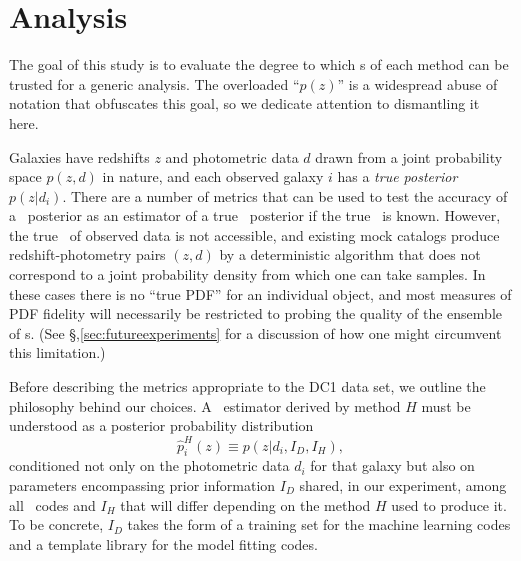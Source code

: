 \section{Analysis}
\label{sec:metrics}

The goal of this study is to evaluate the degree to which \pzpdf s of each method can be trusted for a generic analysis.
The overloaded ``$p(z)$'' is a widespread abuse of notation that obfuscates this goal, so we dedicate attention to dismantling it here.

Galaxies have redshifts $z$ and photometric data $d$ drawn from a joint probability space $p(z, d)$ in nature, and each observed galaxy $i$ has a \textit{true posterior \pzpdf}\ $p(z \vert d_{i})$.
There are a number of metrics that can be used to test the accuracy of a \pz\ posterior as an estimator of a true \pz\ posterior if the true \pzpdf\ is known.
However, the true \pzpdf\ of observed data is not accessible, and existing mock catalogs produce redshift-photometry pairs $(z, d)$ by a deterministic algorithm that does not correspond to a joint probability density from which one can take samples.
In these cases there is no ``true PDF'' for an individual object, and most measures of PDF fidelity will necessarily be restricted to probing the quality of the ensemble of \pzpdf s.
(See \S,\ref{sec:futureexperiments} for a discussion of how one might circumvent this limitation.)

Before describing the metrics appropriate to the DC1 data set, we outline the philosophy behind our choices.
A \pzpdf\ estimator derived by method $H$ must be understood as a posterior probability distribution
\begin{equation}
  \label{eq:pzpdf}
\hat{p}^{H}_{i}(z) \equiv p(z \vert d_{i}, I_{D}, I_{H}),
\end{equation}
conditioned not only on the photometric data $d_{i}$ for that galaxy but also on parameters encompassing prior information $I_{D}$ shared, in our experiment, among all \pzpdf\ codes and $I_{H}$ that will differ depending on the method $H$ used to produce it.
To be concrete, $I_{D}$ takes the form of a training set for the machine learning codes and a template library for the model fitting codes. 


